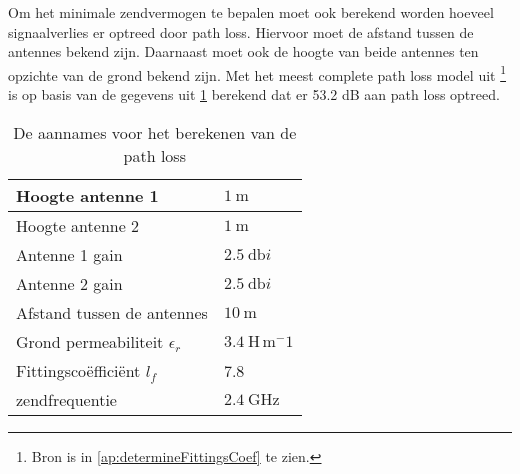 Om het minimale zendvermogen te bepalen moet ook berekend worden hoeveel signaalverlies er optreed door path loss. Hiervoor moet de afstand tussen de antennes bekend zijn. Daarnaast moet ook de hoogte van beide antennes ten opzichte van de grond bekend zijn. Met het meest complete path loss model uit \cite{determineFittingsCoef}
\footnote{Bron \cite{determineFittingsCoef} is in \cref{ap:determineFittingsCoef} te zien.} 
is op basis van de gegevens uit \cref{tab:gegevensCalcPathLoss} berekend dat er 53.2 dB aan path loss optreed.
\begin{table}[ht]
    \centering
    \begin{tabular}{l|l}
        Hoogte antenne 1                    & $\qty{1  }{\meter}$               \\\hline
        Hoogte antenne 2                    & $\qty{1  }{\meter}$               \\\hline
        Antenne 1 gain                      & $\qty{2.5}{\decibel i}$           \\\hline
        Antenne 2 gain                      & $\qty{2.5}{\decibel i}$           \\\hline
        Afstand tussen de antennes          & $\qty{10 }{\meter}$               \\\hline
        Grond permeabiliteit $\epsilon_r$   & $\qty{3.4}{\henry\,\meter^-1}$    \\\hline
        Fittingscoëfficiënt $l_f$           & 7.8                               \\\hline
        zendfrequentie                      & $\qty{2.4}{\giga\hertz}$
    \end{tabular}
    \caption{De aannames voor het berekenen van de path loss}
    \label{tab:gegevensCalcPathLoss}
\end{table}

